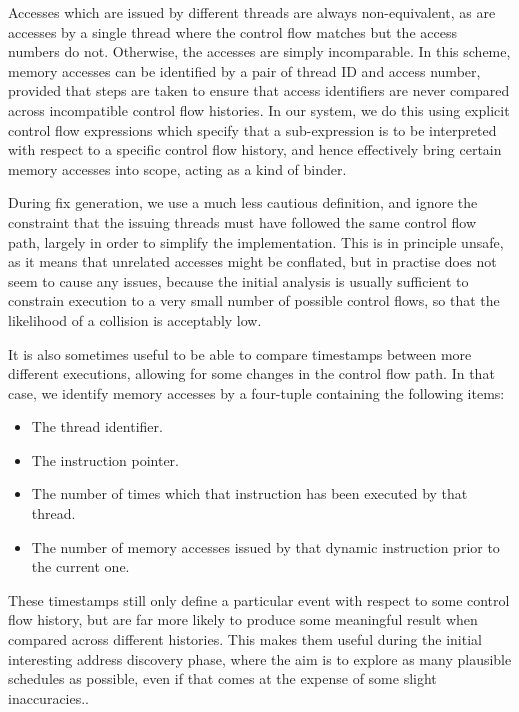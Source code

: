 \documentclass[10pt,a4paper]{report}
\begin{document}
Accesses which are issued by different threads are always
non-equivalent, as are accesses by a single thread where the control
flow matches but the access numbers do not.  Otherwise, the accesses
are simply incomparable.  In this scheme, memory accesses can be
identified by a pair of thread ID and access number, provided that
steps are taken to ensure that access identifiers are never compared
across incompatible control flow histories.  In our system, we do this
using explicit control flow expressions which specify that a
sub-expression is to be interpreted with respect to a specific control
flow history, and hence effectively bring certain memory accesses into
scope, acting as a kind of binder.

During fix generation, we use a much less cautious definition, and
ignore the constraint that the issuing threads must have followed the
same control flow path, largely in order to simplify the
implementation.  This is in principle unsafe, as it means that
unrelated accesses might be conflated, but in practise does not seem
to cause any issues, because the initial analysis is usually
sufficient to constrain execution to a very small number of possible
control flows, so that the likelihood of a collision is acceptably
low.

It is also sometimes useful to be able to compare timestamps between
more different executions, allowing for some changes in the control
flow path.  In that case, we identify memory accesses by a four-tuple
containing the following items:

\begin{itemize}
\item The thread identifier.
\item The instruction pointer.
\item The number of times which that instruction has been executed by
  that thread.
\item The number of memory accesses issued by that dynamic instruction
  prior to the current one.
\end{itemize}

These timestamps still only define a particular event with respect to
some control flow history, but are far more likely to produce some
meaningful result when compared across different histories.  This
makes them useful during the initial interesting address discovery
phase, where the aim is to explore as many plausible schedules as
possible, even if that comes at the expense of some slight
inaccuracies..
\end{document}
